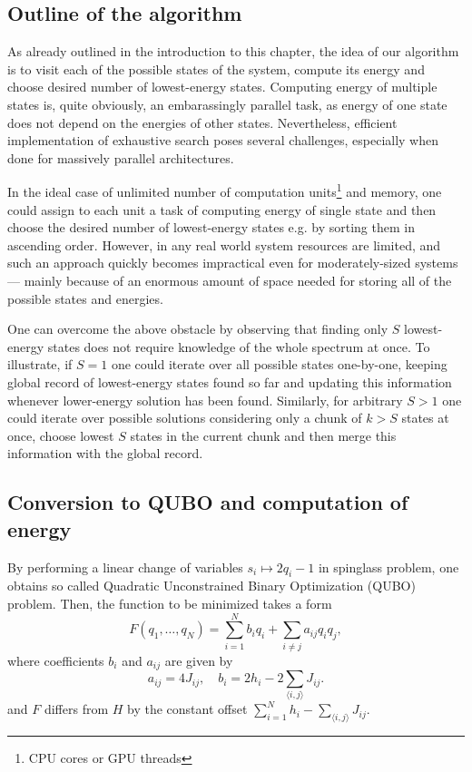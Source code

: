 \subsection{Outline of the algorithm}
As already outlined in the introduction to this chapter, the idea of our algorithm is to visit each of the possible states of the system, compute its energy and choose desired number of lowest-energy states. Computing energy of multiple states is, quite obviously, an embarassingly parallel task, as energy of one state does not depend on the energies of other states.
Nevertheless, efficient implementation of exhaustive search poses several challenges, especially when done for massively parallel architectures.

In the ideal case of unlimited number of computation units\footnote{CPU cores or GPU threads} and memory, one could assign to each unit a task of computing energy of single state and then choose the desired number of lowest-energy states e.g. by sorting them in ascending order. However, in any real world system resources are limited, and such an approach quickly becomes impractical even for moderately-sized systems --- mainly because of an enormous amount of space needed for storing all of the possible states and energies.

One can overcome the above obstacle by observing that finding only $S$ lowest-energy states does not require knowledge of the whole spectrum at once.
To illustrate, if $S=1$ one could iterate over all possible states one-by-one, keeping global record of lowest-energy states found so far and updating this information whenever lower-energy solution has been found. Similarly, for arbitrary $S > 1$ one could iterate over possible solutions considering only a chunk of $k > S$ states at once, choose lowest $S$ states in the current chunk and then merge this information with the global record.


\subsection{Conversion to QUBO and computation of energy}
By performing a linear change of variables $s_i \mapsto 2q_i-1$ in spinglass problem, one obtains so called Quadratic Unconstrained Binary Optimization (QUBO) problem. Then, the function to be minimized takes a form
\begin{equation}
\label{eq:qubo}
    F(q_1, \ldots, q_N) = \sum_{i=1}^N b_iq_i + \sum_{i \ne j} a_{ij} q_i q_j,
\end{equation}
where coefficients $b_i$ and $a_{ij}$ are given by
\begin{equation}
\label{eq:toQUBO}
a_{ij}= 4J_{ij},
\quad 
b_i= 2h_i - 2 \sum_{\langle i, j \rangle} J_{ij}.
\end{equation}
and $F$ differs from $H$ by the constant offset $\sum_{i=1}^N h_i - \sum_{\langle i, j \rangle} J_{ij}$.

